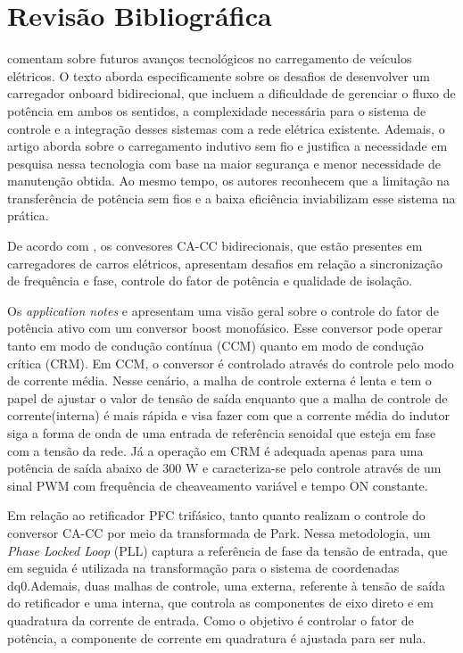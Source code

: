 \chapter{Revisão Bibliográfica}

\cite{Baharom:2024} comentam sobre futuros avanços tecnológicos no carregamento de veículos elétricos. O texto aborda especificamente sobre os desafios de desenvolver um carregador onboard bidirecional, que incluem a dificuldade de gerenciar o fluxo de potência em ambos os sentidos, a complexidade necessária para o sistema de controle e a integração desses sistemas com a rede elétrica existente. Ademais, o artigo aborda sobre o carregamento indutivo sem fio e justifica a necessidade em pesquisa nessa tecnologia com base na maior segurança e menor necessidade de manutenção obtida. Ao mesmo tempo, os autores reconhecem que a limitação na transferência de potência sem fios e a baixa eficiência inviabilizam esse sistema na prática.

De acordo com \cite{Kumar:2021}, os convesores CA-CC bidirecionais, que estão presentes em carregadores de carros elétricos, apresentam desafios em
relação a sincronização de frequência e fase, controle do fator de potência e qualidade de
isolação.


Os \textit{application notes} \cite{onsemi_hbd853} e \cite{ti_zhcp224} apresentam uma visão
geral sobre o controle do fator de potência ativo com um conversor boost monofásico. Esse
conversor pode operar tanto em modo de condução contínua (CCM) quanto em modo de condução
crítica (CRM). Em CCM, o conversor é controlado através do controle pelo modo de corrente
média. Nesse cenário, a malha de controle externa é lenta e tem o papel de ajustar o valor de
tensão de saída enquanto que a malha de controle de corrente(interna) é mais rápida e visa
fazer com que a corrente média do indutor siga a forma de onda de uma entrada de referência
senoidal que esteja em fase com a tensão da rede. Já a operação em CRM é adequada apenas para
uma potência de saída abaixo de 300 W e caracteriza-se pelo controle através de um sinal PWM
com frequência de cheaveamento variável e tempo ON constante.

Em relação ao retificador PFC trifásico, tanto \cite{3phPlecs} quanto \cite{WANG2013/03}
realizam o controle do conversor CA-CC por meio da transformada de Park. Nessa metodologia, um
\textit{Phase Locked Loop} (PLL) captura a referência de fase da tensão de entrada, que em
seguida é utilizada na transformação para o sistema de coordenadas dq0.Ademais, duas malhas de
controle, uma externa, referente à tensão de saída do retificador e uma interna, que controla
as componentes de eixo direto e em quadratura da corrente de entrada. Como o objetivo é
controlar o fator de potência, a componente de corrente em quadratura é ajustada para ser nula.

